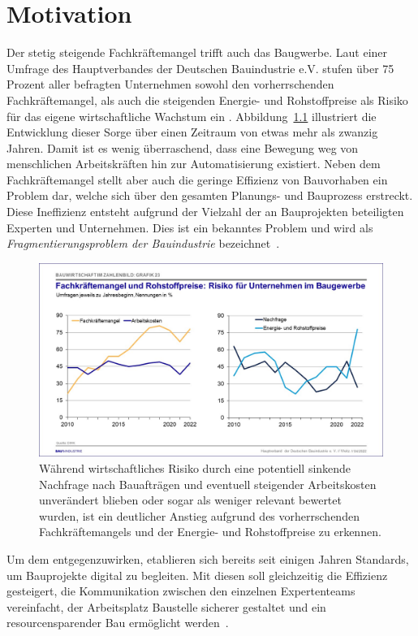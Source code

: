 \chapter{Motivation}\label{motivation}
Der stetig steigende Fachkräftemangel trifft auch das Baugwerbe. 
Laut einer Umfrage des Hauptverbandes der Deutschen Bauindustrie e.V. stufen über 75 Prozent aller befragten Unternehmen sowohl den vorherrschenden Fachkräftemangel, als auch die steigenden Energie- und Rohstoffpreise als Risiko für das eigene wirtschaftliche Wachstum ein \cite{Bauindustrie:online}.
Abbildung~\ref{fig:Fachkraeftemangel} illustriert die Entwicklung dieser Sorge über einen Zeitraum von etwas mehr als zwanzig Jahren.
Damit ist es wenig überraschend, dass eine Bewegung weg von menschlichen Arbeitskräften hin zur Automatisierung existiert.
Neben dem Fachkräftemangel stellt aber auch die geringe Effizienz von Bauvorhaben ein Problem dar, welche sich über den gesamten Planungs- und Bauprozess erstreckt. 
Diese Ineffizienz entsteht aufgrund der Vielzahl der an Bauprojekten beteiligten Experten und Unternehmen.
Dies ist ein bekanntes Problem und wird als \textit{Fragmentierungsproblem der Bauindustrie} bezeichnet~\cite{ConstructionFragmentation}.
\begin{figure}[h]
    \centering
    \includegraphics[width=0.7\columnwidth]{fig/Grafik_23.jpg}
    \caption{Während wirtschaftliches Risiko durch eine potentiell sinkende Nachfrage nach Bauafträgen und eventuell steigender Arbeitskosten unverändert blieben oder sogar als weniger relevant bewertet wurden, ist ein deutlicher Anstieg aufgrund des vorherrschenden Fachkräftemangels und der Energie- und Rohstoffpreise zu erkennen.}
    \label{fig:Fachkraeftemangel}
\end{figure}
Um dem entgegenzuwirken, etablieren sich bereits seit einigen Jahren Standards, um Bauprojekte digital zu begleiten.
Mit diesen soll gleichzeitig die Effizienz gesteigert, die Kommunikation zwischen den einzelnen Expertenteams vereinfacht, der Arbeitsplatz \glqq{}Baustelle\grqq{} sicherer gestaltet und ein resourcensparender Bau ermöglicht werden~\cite{BIMforHe12:online}\cite{Top10Ben31:online}.
